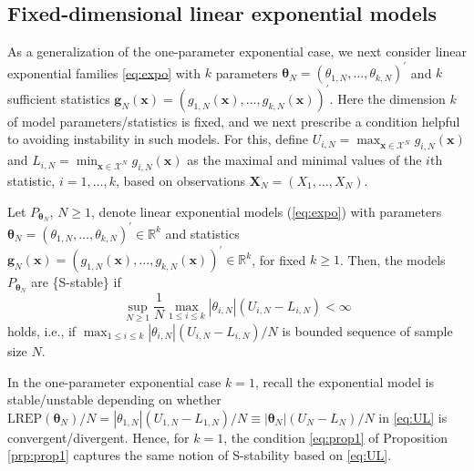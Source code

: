 \documentclass[12pt]{article}
\theoremstyle{definition}
\newcommand{\REP}{\mathrm{LREP}}
\let\BeginKnitrBlock\begin \let\EndKnitrBlock\end
\begin{document}
\subsection{Fixed-dimensional linear exponential
models}\label{fixed-dim-exp}

As a generalization of the one-parameter exponential case, we next
consider linear exponential families \eqref{eq:expo} with \(k\) parameters
\(\boldsymbol \theta_N = (\theta_{1,N},\ldots,\theta_{k,N})^\prime\) and
\(k\) sufficient statistics
\(\boldsymbol g_N(\boldsymbol x) = (g_{1,N}(\boldsymbol x),\ldots, g_{k,N}(\boldsymbol x))^\prime\).
Here the dimension \(k\) of model parameters/statistics is fixed, and we
next prescribe a condition helpful to avoiding instability in such
models. For this, define
\(U_{i,N}=\max_{\boldsymbol x \in\mathcal{X}^N} g_{i,N}(\boldsymbol x)\)
and
\(L_{i,N}=\min_{\boldsymbol x \in\mathcal{X}^N} g_{i,N}(\boldsymbol x)\)
as the maximal and minimal values of the \(i\)th statistic,
\(i=1,\ldots,k\), based on observations
\(\boldsymbol X_N=(X_1,\ldots,X_N)\).

\BeginKnitrBlock{proposition}
\protect\hypertarget{prp:prop1}{}{\label{prp:prop1}}Let
\(P_{\boldsymbol \theta_N}\), \(N \geq 1\), denote linear exponential
models (\ref{eq:expo}) with parameters
\(\boldsymbol \theta_N = (\theta_{1,N},\ldots,\theta_{k,N})^\prime \in \mathbb{R}^k\)
and statistics
\(\boldsymbol g_N(\boldsymbol x) = (g_{1,N}(\boldsymbol x),\ldots, g_{k,N}(\boldsymbol x))^\prime \in \mathbb{R}^k\),
for fixed \(k \geq 1\). Then, the models \(P_{\boldsymbol \theta_N}\)
are \{\rm S-stable\} if
\begin{equation}
\label{eq:prop1}
\sup_{N \geq 1}\frac{1}{N} \max_{1 \leq i \leq k }|\theta_{i,N}|(U_{i,N}-L_{i,N})<\infty
\end{equation}
holds, i.e., if
\(\max_{1 \leq i \leq k } |\theta_{i,N}|(U_{i,N}-L_{i,N})/N\) is bounded
sequence of sample size \(N\).
\EndKnitrBlock{proposition}

\BeginKnitrBlock{remark}
\iffalse <span class="remark"><em>Remark. \fi{} In the one-parameter
exponential case \(k=1\), recall the exponential model is
stable/unstable depending on whether
\(\REP(\boldsymbol \theta_N)/N = |\theta_{1,N}|(U_{1,N}-L_{1,N})/N \equiv |\boldsymbol \theta_{N}|(U_{N}-L_{N})/N\)
in \eqref{eq:UL} is convergent/divergent. Hence, for \(k=1\), the
condition \eqref{eq:prop1} of Proposition \ref{prp:prop1} captures the
same notion of S-stability based on \eqref{eq:UL}.
\EndKnitrBlock{remark}
\end{document}
